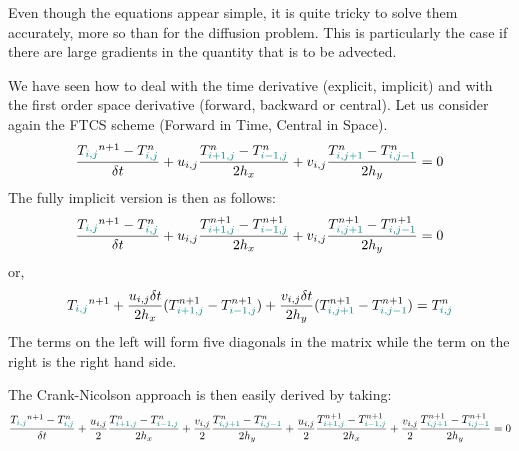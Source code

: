 Even though the equations appear simple, it is quite tricky to solve them accurately, 
more so than for the diffusion problem. 
This is particularly the case if there are large gradients in the quantity that is to be advected. 

We have seen how to deal with the time derivative (explicit, implicit) 
and with the first order space derivative (forward, backward or central).
Let us consider again the FTCS scheme (Forward in Time, Central in Space).
\begin{equation}
\frac{T_{\color{teal}i,j}^{n+1}-T^n_{\color{teal}i,j}}{\delta t} 
+ u_{i,j} \frac{T^n_{\color{teal}i+1,j} - T^n_{{\color{teal}i-1,j}}}{2h_x} 
+ v_{i,j} \frac{T^n_{\color{teal}i,j+1} - T^n_{{\color{teal}i,j-1}}}{2h_y} =0 
\end{equation}
The fully implicit version is then as follows:
\begin{equation}
\frac{T_{\color{teal}i,j}^{n+1}-T^n_{\color{teal}i,j}}{\delta t} 
+ u_{i,j} \frac{T^{n+1}_{\color{teal}i+1,j} - T^{n+1}_{{\color{teal}i-1,j}}}{2h_x} 
+ v_{i,j} \frac{T^{n+1}_{\color{teal}i,j+1} - T^{n+1}_{{\color{teal}i,j-1}}}{2h_y} =0 
\end{equation}
or, 
\[
T_{\color{teal}i,j}^{n+1}   
+\frac{u_{i,j} \delta t}{2 h_x}
(  T^{n+1}_{\color{teal}i+1,j} - T^{n+1}_{{\color{teal}i-1,j}}  )
+\frac{v_{i,j} \delta t}{2 h_y}
(  T^{n+1}_{\color{teal}i,j+1} - T^{n+1}_{{\color{teal}i,j-1}} )
=
T^n_{\color{teal}i,j}
\]
The terms on the left will form five diagonals in the matrix while the term on the right 
is the right hand side.

The Crank-Nicolson approach is then easily derived by taking:
\begin{equation}
\frac{T_{\color{teal}i,j}^{n+1}-T^n_{\color{teal}i,j}}{\delta t} 
+\frac{u_{i,j}}{2} \frac{T^{n}_{\color{teal}i+1,j} - T^{n}_{{\color{teal}i-1,j}}}{2h_x} 
+\frac{v_{i,j}}{2} \frac{T^{n}_{\color{teal}i,j+1} - T^{n}_{{\color{teal}i,j-1}}}{2h_y} 
+\frac{u_{i,j}}{2} \frac{T^{n+1}_{\color{teal}i+1,j} - T^{n+1}_{{\color{teal}i-1,j}}}{2h_x} 
+\frac{v_{i,j}}{2} \frac{T^{n+1}_{\color{teal}i,j+1} - T^{n+1}_{{\color{teal}i,j-1}}}{2h_y} 
=0 
\end{equation}

